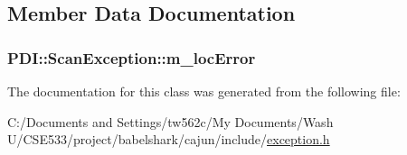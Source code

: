 \subsection{Member Data Documentation}
\hypertarget{class_p_d_i_1_1_scan_exception_0e9a36903300a3afcfffcff14898f1db}{
\subsubsection[{m\_\-locError}]{ {\bf PDI::ScanException::m\_\-locError}}}
\label{class_p_d_i_1_1_scan_exception_0e9a36903300a3afcfffcff14898f1db}




The documentation for this class was generated from the following file:\begin{CompactItemize}
\item 
C:/Documents and Settings/tw562c/My Documents/Wash U/CSE533/project/babelshark/cajun/include/\hyperlink{exception_8h}{exception.h}\end{CompactItemize}
